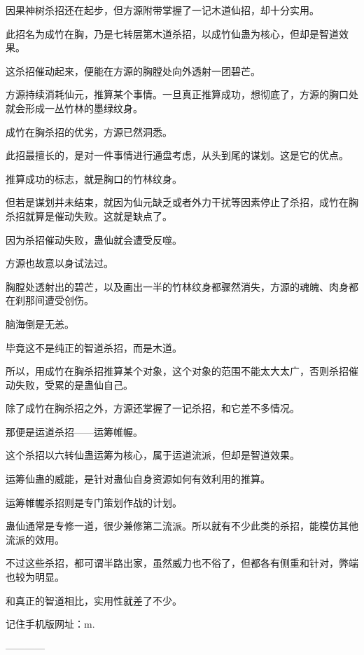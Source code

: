 \begin{this_body}
因果神树杀招还在起步，但方源附带掌握了一记木道仙招，却十分实用。

此招名为成竹在胸，乃是七转层第木道杀招，以成竹仙蛊为核心，但却是智道效果。

这杀招催动起来，便能在方源的胸膛处向外透射一团碧芒。

方源持续消耗仙元，推算某个事情。一旦真正推算成功，想彻底了，方源的胸口处就会形成一丛竹林的墨绿纹身。

成竹在胸杀招的优劣，方源已然洞悉。

此招最擅长的，是对一件事情进行通盘考虑，从头到尾的谋划。这是它的优点。

推算成功的标志，就是胸口的竹林纹身。

但若是谋划并未结束，就因为仙元缺乏或者外力干扰等因素停止了杀招，成竹在胸杀招就算是催动失败。这就是缺点了。

因为杀招催动失败，蛊仙就会遭受反噬。

方源也故意以身试法过。

胸膛处透射出的碧芒，以及画出一半的竹林纹身都骤然消失，方源的魂魄、肉身都在刹那间遭受创伤。

脑海倒是无恙。

毕竟这不是纯正的智道杀招，而是木道。

所以，用成竹在胸杀招推算某个对象，这个对象的范围不能太大太广，否则杀招催动失败，受累的是蛊仙自己。

除了成竹在胸杀招之外，方源还掌握了一记杀招，和它差不多情况。

那便是运道杀招——运筹帷幄。

这个杀招以六转仙蛊运筹为核心，属于运道流派，但却是智道效果。

运筹仙蛊的威能，是针对蛊仙自身资源如何有效利用的推算。

运筹帷幄杀招则是专门策划作战的计划。

蛊仙通常是专修一道，很少兼修第二流派。所以就有不少此类的杀招，能模仿其他流派的效用。

不过这些杀招，都可谓半路出家，虽然威力也不俗了，但都各有侧重和针对，弊端也较为明显。

和真正的智道相比，实用性就差了不少。

记住手机版网址：m.

------------

\end{this_body}

